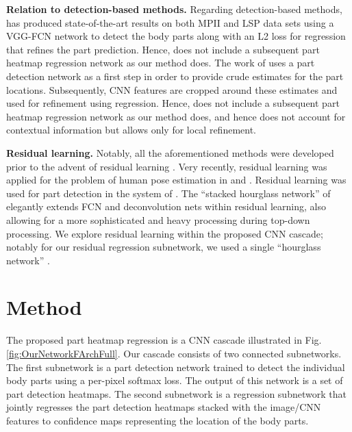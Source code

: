 \documentclass[runningheads]{llncs}
\begin{document}
\textbf{Relation to detection-based methods.} Regarding detection-based methods, \cite{pishchulin2015deepcut} has produced state-of-the-art results on both MPII and LSP data sets using a VGG-FCN network \cite{simonyan2014very, long2015fully} to detect the body parts along with an L2 loss for regression that refines the part prediction. Hence, \cite{pishchulin2015deepcut} does not include a subsequent part heatmap regression network as our method does. The work of \cite{tompson2015efficient} uses a part detection network as a first step in order to provide crude estimates for the part locations. Subsequently, CNN features are cropped around these estimates and used for refinement using regression. Hence, \cite{tompson2015efficient} does not include a subsequent part heatmap regression network as our method does, and hence does not account for contextual information but allows only for local refinement. 

\textbf{Residual learning.} Notably, all the aforementioned methods were developed prior to the advent of residual learning \cite{he2016deep}. Very recently, residual learning was applied for the problem of human pose estimation in \cite{insafutdinov2016deepercut} and \cite{newell2016stacked}. Residual learning was used for part detection in the system of \cite{insafutdinov2016deepercut}. The ``stacked hourglass network'' of \cite{newell2016stacked} elegantly extends FCN \cite{long2015fully} and deconvolution nets \cite{zeiler2011adaptive} within residual learning, also allowing for a more sophisticated and heavy processing during top-down processing. We explore residual learning within the proposed CNN cascade; notably for our residual regression subnetwork, we used a single ``hourglass network'' \cite{newell2016stacked}.

\section{Method}

The proposed part heatmap regression is a CNN cascade illustrated in Fig. \ref{fig:OurNetworkFArchFull}. Our cascade consists of two connected subnetworks. The first subnetwork is a part detection network trained to detect the individual body parts using a per-pixel softmax loss. The output of this network is a set of  part detection heatmaps. The second subnetwork is a regression subnetwork that jointly regresses the part detection heatmaps stacked with the image/CNN features to confidence maps representing the location of the body parts. 
\end{document}
